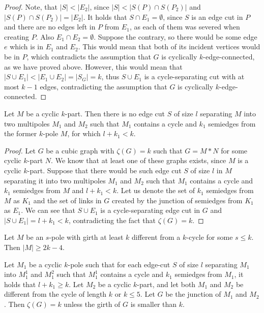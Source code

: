 \begin{proof}
	 Note, that $|S| < |E_2|$, since $|S| < |S(P)\cap S(P_2)|$ and $|S(P)\cap S(P_2)|=|E_2|$. It holds that $S\cap E_1=\emptyset$, since $S$ is an edge cut in $P$ and there are no edges left in $P$ from $E_1$, as each of them was severed when creating $P$. Also $E_1\cap E_2=\emptyset$. Suppose the contrary, so there would be some edge $e$ which is in $E_1$ and $E_2$. This would mean that both of its incident vertices would be in $P$, which contradicts the assumption that $G$ is cyclically $k$-edge-connected, as we have proved above. However, this would mean that $|S\cup E_1|< |E_1\cup E_2| = |S_G|=k$, thus $S\cup E_1$ is a cycle-separating cut with at most $k-1$ edges, contradicting the assumption that $G$ is cyclically $k$-edge-connected.
	
\end{proof}

\begin{lemma}
	Let $M$ be a cyclic $k$-part. Then there is no edge cut $S$ of size $l$ separating $M$ into two multipoles $M_1$ and $M_2$ such that $M_1$ contains a cycle and $k_1$ semiedges from the former $k$-pole $M$, for which $l+k_1 < k$.
\end{lemma}

\begin{proof}
	Let $G$ be a cubic graph with $\zeta(G)=k$ such that $G=M*N$ for some cyclic $k$-part $N$. We know that at least one of these graphs exists, since $M$ is a cyclic $k$-part. Suppose that there would be such edge cut $S$ of size $l$ in $M$ separating it into two multipoles $M_1$ and $M_2$ such that $M_1$ contains a cycle and $k_1$ semiedges from $M$ and $l+k_1 < k$. Let us denote the set of $k_1$ semiedges from $M$ as $K_1$ and the set of links in $G$ created by the junction of semiedges from $K_1$ as $E_1$. We can see that $S\cup E_1$ is a cycle-separating edge cut in $G$ and $|S\cup E_1|=l+k_1 < k$, contradicting the fact that $\zeta(G)=k$.
\end{proof}

\begin{lemma}\label{lem:rajnik5.1}
	Let $M$ be an $s$-pole with girth at least $k$ different from a $k$-cycle for some $s\leq k$. Then $|M| \geq 2k - 4$.
\end{lemma}

\begin{theorem}
	Let $M_1$ be a cyclic $k$-pole such that for each edge-cut $S$ of size $l$ separating $M_1$ into $M_1^1$ and $M_1^2$ such that $M_1^1$ contains a cycle and $k_1$ semiedges from $M_1$, it holds that $l+k_1\geq k$. Let $M_2$ be a cyclic $k$-part, and let both $M_1$ and $M_2$ be different from the cycle of length $k$ or $k\leq 5$. Let $G$ be the junction of $M_1$ and $M_2$. Then $\zeta(G)=k$ unless the girth of $G$ is smaller than $k$.
\end{theorem}

